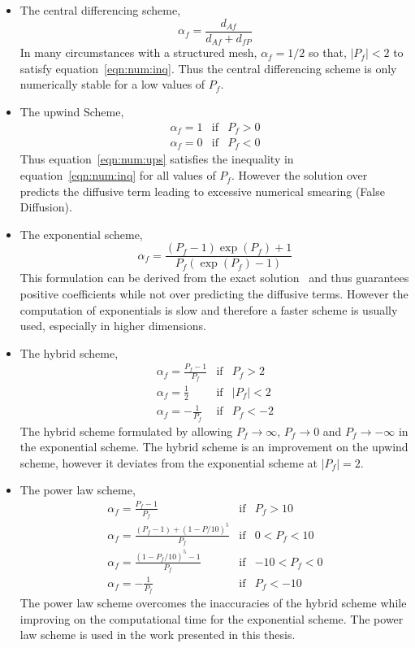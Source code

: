 \begin{itemize}
%
%
%
\item The central differencing scheme,
\begin{equation}
\alpha_f = \frac{d_{Af}}{d_{Af}+d_{fP}}
\label{eqn:num:cds}
\end{equation}
In many circumstances with a structured mesh, $\alpha_f=1/2$ so that,
$|P_f|<2$ to satisfy equation~\eqref{eqn:num:inq}.
Thus the central differencing scheme is only
numerically stable for a low values of $P_f$.
%
%
%
\item The upwind Scheme,
\begin{eqnarray}
\alpha_f = 1 & \mbox{if} & P_f > 0 \\
\alpha_f = 0 & \mbox{if} & P_f < 0 
\label{eqn:num:ups}
\end{eqnarray}
Thus equation~\eqref{eqn:num:ups} satisfies the inequality in
equation~\eqref{eqn:num:inq} for all values of $P_f$.
However the solution over predicts the diffusive term leading to excessive
numerical smearing (False Diffusion).
%
%
%
\item The exponential scheme,
\begin{equation}
\alpha_f = \frac{(P_f-1)\exp{(P_f)}+1}{P_f(\exp{(P_f)}-1)}
\label{eqn:num:exs}
\end{equation}
This formulation can be derived from the exact solution~\cite{croftphd}
and thus guarantees
positive coefficients while not over predicting the diffusive terms.
However the computation of exponentials is slow and therefore a
faster scheme is usually used, especially in higher dimensions.
%
%
%
\item The hybrid scheme,
\begin{eqnarray}
\alpha_f = \frac{P_f-1}{P_f} & \mbox{if} & P_f > 2 \\
\alpha_f = \frac{1}{2} & \mbox{if} & |P_f| < 2 \\
\alpha_f = -\frac{1}{P_f} & \mbox{if} & P_f < -2
\label{eqn:num:hys}
\end{eqnarray}
The hybrid scheme formulated by allowing $P_f \rightarrow \infty$, $P_f \rightarrow 0$
and $P_f \rightarrow -\infty$ in the exponential scheme.
The hybrid scheme is an improvement on the upwind scheme, however it deviates
from the exponential scheme at $|P_f|=2$.
%
%
%
\item The power law scheme,
\begin{eqnarray}
\alpha_f = \frac{P_f-1}{P_f} & \mbox{if} & P_f > 10 \\
\alpha_f = \frac{(P_f-1)+(1-P/10)^5}{P_f} & \mbox{if} & 0 < P_f < 10 \\
\alpha_f = \frac{(1-P_f/10)^5 - 1}{P_f} & \mbox{if} & -10 < P_f < 0 \\
\alpha_f = -\frac{1}{P_f} & \mbox{if} & P_f < -10
\label{eqn:num:pls}
\end{eqnarray}
The power law scheme overcomes the inaccuracies of the hybrid scheme while
improving on the computational time for the exponential scheme. The power
law scheme is used in the work presented in this thesis.
\end{itemize}








